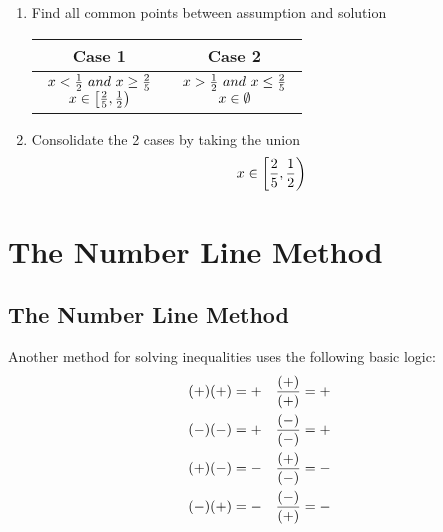 \begin{exercise}
\begin{enumerate}
		\item
		      Find all common points between assumption and solution \\
		      \begin{table}[H]
			      \centering
			      \begin{tabular}{|c|c|} \hline
				      \textbf{Case 1} & \textbf{Case 2}                \\ \hline
				      $ \begin{array}{ccc} x < {1 \over 2} \ and \ x \ge {2 \over 5} \\ x \in \left[{2 \over 5}, {1 \over 2}\right) \end{array} $
				                      & $ \begin{array}{ccc} x > {1 \over 2} \ and \ x \le {2 \over 5} \\ x \in \emptyset \end{array} $ \\ \hline
			      \end{tabular}
		      \end{table}

		\item
		      Consolidate the 2 cases by taking the union \\
		      $$
			      x \in \left[{2 \over 5}, {1 \over 2}\right)
		      $$
	\end{enumerate}
\end{exercise}

\chapter{The Number Line Method}

\section{The Number Line Method}

Another method for solving inequalities uses the following basic logic: \\

\begin{align}
	\nonumber
	(+)(+) = + &  & {(+) \over (+)} = + \\
	\nonumber
	(-)(-) = + &  & {(-) \over (-)} = + \\
	\nonumber
	(+)(-) = - &  & {(+) \over (-)} = - \\
	\nonumber
	(-)(+) = - &  & {(-) \over (+)} = -
\end{align}

